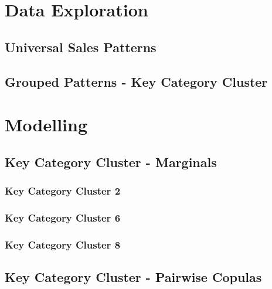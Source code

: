 \documentclass[11pt, twoside]{article}
\numberwithin{equation}{section}
\numberwithin{table}{section}
\numberwithin{figure}{section}
\begin{document}
\thispagestyle{plain}
\section{Data Exploration} \label{sec:data_exploration}

\subsection{Universal Sales Patterns} \label{ssec:sales_patterns}

\subsection{Grouped Patterns - Key Category Cluster} \label{ssec:grouped_patterns}

%
\newpage
\thispagestyle{empty}
\cleardoublepage

\thispagestyle{plain}
\section{Modelling} \label{sec:modelling}

\subsection{Key Category Cluster - Marginals} \label{ssec:kcc_marginals}

\subsubsection{Key Category Cluster 2} \label{sssec:margin_kcc_2}

\subsubsection{Key Category Cluster 6} \label{sssec:margin_kcc_6}

\subsubsection{Key Category Cluster 8} \label{sssec:margin_kcc_8}


\subsection{Key Category Cluster - Pairwise Copulas}
\label{ssec:kcc_copulas}

\end{document}
